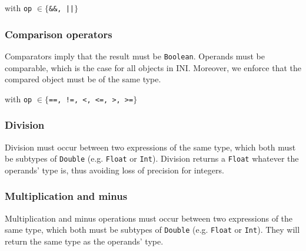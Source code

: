 \documentclass[11pt]{article}
\begin{document}
\begin{center}
 
\DP
\end{center}
\begin{center}with  \texttt{op} $\in \{$\texttt{\&\&, ||}$\}$\end{center}

\subsubsection{Comparison operators}

Comparators imply that the result must be \texttt{Boolean}. Operands must be comparable, which is the case for all objects in INI. Moreover, we enforce that the compared object must be of the same type.

\begin{center}
 
\DP
\end{center}
\begin{center}with  \texttt{op} $\in \{$\texttt{==, !=, <, <=, >, >=}$\}$\end{center}

\subsubsection{Division}

Division must occur between two expressions of the same type, which both must be subtypes of \texttt{Double} (e.g. \texttt{Float} or \texttt{Int}). Division returns a \texttt{Float} whatever the operands' type is, thus avoiding loss of precision for integers.

\begin{center}
 
\DP
\end{center}

\subsubsection{Multiplication and minus}

Multiplication and minus operations must occur between two expressions of the same type, which both must be subtypes of \texttt{Double} (e.g. \texttt{Float} or \texttt{Int}). They will return the same type as the operands' type.
\end{document}
